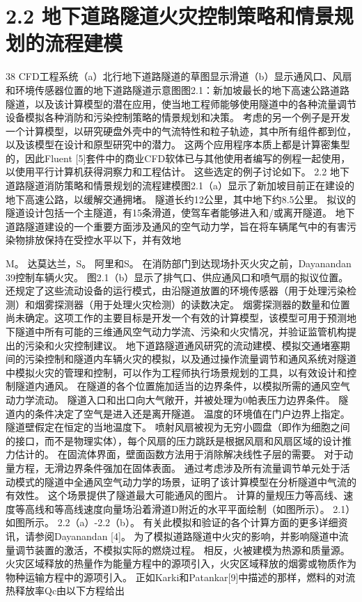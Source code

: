 \documentclass[UTF8,11pt,a4paper,openany,fontset=fandol]{ctexbook}
\begin{document}
\section{2.2 地下道路隧道火灾控制策略和情景规划的流程建模}
38 CFD工程系统（a）北行地下道路隧道的草图显示滑道（b）显示通风口、风扇和环境传感器位置的地下道路隧道示意图图2.1：新加坡最长的地下高速公路道路隧道，以及该计算模型的潜在应用，使当地工程师能够使用隧道中的各种流量调节设备模拟各种消防和污染控制策略的情景规划和决策。 考虑的另一个例子是开发一个计算模型，以研究硬盘外壳中的气流特性和粒子轨迹，其中所有组件都到位，以及该模型在设计和原型研究中的潜力。 这两个应用程序本质上都是计算密集型的，因此Fluent [5]套件中的商业CFD软体已与其他使用者编写的例程一起使用，以使用平行计算机获得洞察力和工程估计。 这些选定的例子讨论如下。 2.2 地下道路隧道消防策略和情景规划的流程建模图2.1（a）显示了新加坡目前正在建设的地下高速公路，以缓解交通拥堵。 隧道长约12公里，其中地下约8.5公里。 拟议的隧道设计包括一个主隧道，有15条滑道，使驾车者能够进入和/或离开隧道。 地下道路隧道建设的一个重要方面涉及通风的空气动力学，旨在将车辆尾气中的有害污染物排放保持在受控水平以下，并有效地

M。 达莫达兰，S。 阿里和S。 在消防部门到达现场扑灭火灾之前，Dayanandan 39控制车辆火灾。 图2.1（b）显示了排气口、供应通风口和喷气扇的拟议位置。 还规定了这些流动设备的运行模式，由沿隧道放置的环境传感器（用于处理污染检测）和烟雾探测器（用于处理火灾检测）的读数决定。 烟雾探测器的数量和位置尚未确定。这项工作的主要目标是开发一个有效的计算模型，该模型可用于预测地下隧道中所有可能的三维通风空气动力学流、污染和火灾情况，并验证监管机构提出的污染和火灾控制建议。 地下道路隧道通风研究的流动建模、模拟交通堵塞期间的污染控制和隧道内车辆火灾的模拟，以及通过操作流量调节和通风系统对隧道中模拟火灾的管理和控制，可以作为工程师执行场景规划的工具，以有效设计和控制隧道内通风。 在隧道的各个位置施加适当的边界条件，以模拟所需的通风空气动力学流动。 隧道入口和出口向大气敞开，并被处理为0帕表压力边界条件。 隧道内的条件决定了空气是进入还是离开隧道。 温度的环境值在门户边界上指定。 隧道壁假定在恒定的当地温度下。 喷射风扇被视为无穷小圆盘（即作为细胞之间的接口，而不是物理实体），每个风扇的压力跳跃是根据风扇和风扇区域的设计推力估计的。 在固流体界面，壁面函数方法用于消除解决线性子层的需要。 对于动量方程，无滑边界条件强加在固体表面。 通过考虑涉及所有流量调节单元处于活动模式的隧道中全通风空气动力学的场景，证明了该计算模型在分析隧道中气流的有效性。 这个场景提供了隧道最大可能通风的图片。 计算的量规压力等高线、速度等高线和等高线速度向量场沿着滑道D附近的水平平面绘制（如图所示）。 2.1）如图所示。 2.2（a）-2.2（b）。 有关此模拟和验证的各个计算方面的更多详细资讯，请参阅Dayanandan [4]。 为了模拟道路隧道中火灾的影响，并影响隧道中流量调节装置的激活，不模拟实际的燃烧过程。 相反，火被建模为热源和质量源。 火灾区域释放的热量作为能量方程中的源项引入，火灾区域释放的烟雾或物质作为物种运输方程中的源项引入。 正如Karki和Patankar[9]中描述的那样，燃料的对流热释放率Qc由以下方程给出
\end{document}
